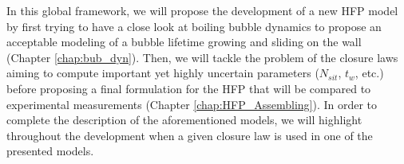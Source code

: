 In this global framework, we will propose the development of a new HFP model by first trying to have a close look at boiling bubble dynamics to propose an acceptable modeling of a bubble lifetime growing and sliding on the wall  (Chapter \ref{chap:bub_dyn}). Then, we will tackle the problem of the closure laws aiming to compute important yet highly uncertain parameters ($N_{sit}$, $t_{w}$, etc.) before proposing a final formulation for the HFP that will be compared to experimental measurements (Chapter \ref{chap:HFP_Assembling}). In order to complete the description of the aforementioned models, we will highlight throughout the development when a given closure law is used in one of the presented models.
%
%
%
%
%
%
%
%
%
%
%

